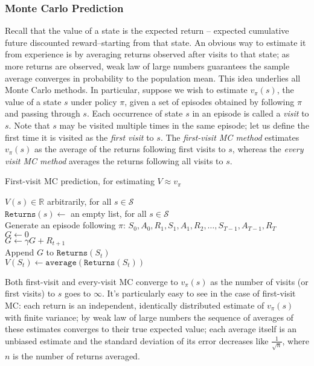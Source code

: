 \documentclass[12pt]{article}
\begin{document}
\subsubsection{Monte Carlo Prediction}
Recall that the value of a state is the expected return -- expected cumulative future discounted reward--starting from that state. An obvious way to estimate it from experience is by averaging returns observed after visits to that state; as more returns are observed, weak law of large numbers guarantees the sample average converges in probability to the population mean. This idea underlies all Monte Carlo methods. In particular, suppose we wish to estimate $v_\pi(s)$, the value of a state $s$ under policy $\pi$, given a set of episodes obtained by following $\pi$ and passing through $s$. Each occurrence of state $s$ in an episode is called a \emph{visit} to $s$. Note that $s$ may be visited multiple times in the same episode; let us define the first time it is visited as the \emph{first visit} to $s$. The \emph{first-visit MC method} estimates $v_\pi(s)$ as the average of the returns following first visits to $s$, whereas the \emph{every visit MC method} averages the returns following all visits to $s$.
\begin{algorithm}[h]
  \caption{First-visit MC prediction, for estimating $V \approx v_\pi$}
  $V(s) \in \mathbb R$ arbitrarily, for all $s \in \mathcal S$ \\
  $\texttt{Returns}(s) \gets$ an empty list, for all $s \in \mathcal S$ \\
   {
    Generate an episode following $\pi$: $S_0, A_0, R_1, S_1, A_1, R_2,     \ldots,S_{T-1}, A_{T-1}, R_T$ \\
    $G\gets 0$ \\
     {
      $G \gets \gamma G + R_{t+1}$ \\
       {
        Append $G$ to $\texttt{Returns}(S_t)$ \\
        $V(S_t) \gets \texttt{average}(\texttt{Returns}(S_t))$
      }
    }
  }
\end{algorithm}
Both first-visit and every-visit MC converge to $v_\pi(s)$ as the number of visits (or first visits) to $s$ goes to $\infty$. It's particularly easy to see in the case of first-visit MC: each return is an independent, identically distributed estimate of $v_\pi(s)$ with finite variance; by weak law of large numbers the sequence of averages of these estimates converges to their true expected value; each average itself is an unbiased estimate and the standard deviation of its error decreases like $\frac{1}{\sqrt n}$, where $n$ is the number of returns averaged.
\end{document}
